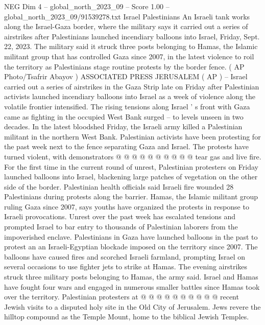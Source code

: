 \begin{textsample}{NEG Dim 4 – global\_north\_2023\_09 – Score 1.00 – global\_north\_2023\_09/91539278.txt}  \label{ex:f4_neg_044}
Israel Palestinians An Israeli tank works along the Israel-Gaza border, where the military says it carried out a series of airstrikes after Palestinians launched incendiary balloons into Israel, Friday, Sept. 22, 2023.
The military said it struck three posts belonging to Hamas, the Islamic militant group that has controlled Gaza since 2007, in the latest violence to roil the territory as Palestinians stage routine protests by the border fence. ( AP Photo/Tsafrir Abayov ) ASSOCIATED PRESS JERUSALEM ( AP ) -- Israel carried out a series of airstrikes in the Gaza Strip late on Friday after Palestinian activists launched incendiary balloons into Israel as a week of violence along the volatile frontier intensified.
The rising tensions along Israel ' s front with Gaza came as fighting in the occupied West Bank surged -- to levels unseen in two decades.
In the latest bloodshed Friday, the Israeli army killed a Palestinian militant in the northern West Bank.
Palestinian activists have been protesting for the past week next to the fence separating Gaza and Israel.
The protests have turned violent, with demonstrators @ @ @ @ @ @ @ @ @ @ tear gas and live fire.
For the first time in the current round of unrest, Palestinian protesters on Friday launched balloons into Israel, blackening large patches of vegetation on the other side of the border.
Palestinian health officials said Israeli fire wounded 28 Palestinians during protests along the barrier.
Hamas, the Islamic militant group ruling Gaza since 2007, says youths have organized the protests in response to Israeli provocations.
Unrest over the past week has escalated tensions and prompted Israel to bar entry to thousands of Palestinian laborers from the impoverished enclave.
Palestinians in Gaza have launched balloons in the past to protest an an Israeli-Egyptian blockade imposed on the territory since 2007.
The balloons have caused fires and scorched Israeli farmland, prompting Israel on several occasions to use fighter jets to strike at Hamas.
The evening airstrikes struck three military posts belonging to Hamas, the army said.
Israel and Hamas have fought four wars and engaged in numerous smaller battles since Hamas took over the territory.
Palestinian protesters at @ @ @ @ @ @ @ @ @ @ recent Jewish visits to a disputed holy site in the Old City of Jerusalem.
Jews revere the hilltop compound as the Temple Mount, home to the biblical Jewish Temples.

\end{textsample}
